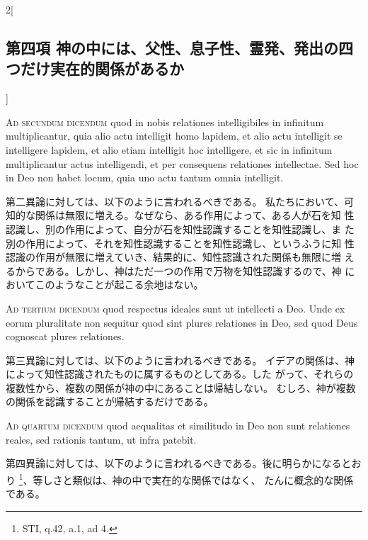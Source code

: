 \documentclass[paper=a4paper,fontsize=10pt,jafontsize=9pt,titlepage]{jlreq}
\begin{document}
\begin{paracol}{2}[\subsection{第四項 神の中には、父性、息子性、霊発、発出の四つだけ実在的関係があるか}]
\switchcolumn*[\subsection{ad.2}]


{\scshape Ad secundum dicendum} quod in nobis relationes intelligibiles in
infinitum multiplicantur, quia alio actu intelligit homo lapidem, et
alio actu intelligit se intelligere lapidem, et alio etiam intelligit
hoc intelligere, et sic in infinitum multiplicantur actus intelligendi,
et per consequens relationes intellectae. Sed hoc in Deo non habet
locum, quia uno actu tantum omnia intelligit.


\switchcolumn


第二異論に対しては、以下のように言われるべきである。
私たちにおいて、可知的な関係は無限に増える。なぜなら、ある作用によって、ある人が石を知
 性認識し、別の作用によって、自分が石を知性認識することを知性認識し、ま
 た別の作用によって、それを知性認識することを知性認識し、というふうに知
 性認識の作用が無限に増えていき、結果的に、知性認識された関係も無限に増
 えるからである。しかし、神はただ一つの作用で万物を知性認識するので、神
 においてこのようなことが起こる余地はない。


\switchcolumn*[\subsection{ad.3}]


{\scshape Ad tertium dicendum} quod respectus ideales sunt ut intellecti a
Deo. Unde ex eorum pluralitate non sequitur quod sint plures relationes
in Deo, sed quod Deus cognoscat plures relationes.


\switchcolumn


第三異論に対しては、以下のように言われるべきである。
イデアの関係は、神によって知性認識されたものに属するものとしてある。した
 がって、それらの複数性から、複数の関係が神の中にあることは帰結しない。
 むしろ、神が複数の関係を認識することが帰結するだけである。


\switchcolumn*[\subsection{ad.4}]


{\scshape Ad quartum dicendum} quod aequalitas et similitudo in Deo non sunt
relationes reales, sed rationis tantum, ut infra patebit.


\switchcolumn


第四異論に対しては、以下のように言われるべきである。後に明らかになるとおり
\footnote{STI, q.42, a.1, ad 4.}、等しさと類似は、神の中で実在的な関係ではなく、
たんに概念的な関係である。



\end{paracol}
\end{document}
